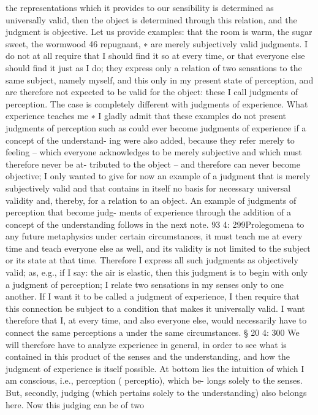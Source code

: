 the representations which it provides to our sensibility is determined as
universally valid, then the object is determined through this relation, and
the judgment is objective.
Let us provide examples: that the room is warm, the sugar sweet,
the wormwood 46 repugnant, ∗ are merely subjectively valid judgments.
I do not at all require that I should ﬁnd it so at every time, or that
everyone else should ﬁnd it just as I do; they express only a relation of
two sensations to the same subject, namely myself, and this only in my
present state of perception, and are therefore not expected to be valid for
the object: these I call judgments of perception. The case is completely
different with judgments of experience. What experience teaches me
∗
I gladly admit that these examples do not present judgments of perception such
as could ever become judgments of experience if a concept of the understand-
ing were also added, because they refer merely to feeling – which everyone
acknowledges to be merely subjective and which must therefore never be at-
tributed to the object – and therefore can never become objective; I only wanted
to give for now an example of a judgment that is merely subjectively valid and
that contains in itself no basis for necessary universal validity and, thereby, for a
relation to an object. An example of judgments of perception that become judg-
ments of experience through the addition of a concept of the understanding
follows in the next note.
93
4: 299Prolegomena to any future metaphysics
under certain circumstances, it must teach me at every time and teach
everyone else as well, and its validity is not limited to the subject or its
state at that time. Therefore I express all such judgments as objectively
valid; as, e.g., if I say: the air is elastic, then this judgment is to begin
with only a judgment of perception; I relate two sensations in my senses
only to one another. If I want it to be called a judgment of experience, I
then require that this connection be subject to a condition that makes it
universally valid. I want therefore that I, at every time, and also everyone
else, would necessarily have to connect the same perceptions a under the
same circumstances.
§ 20
4: 300
We will therefore have to analyze experience in general, in order to see
what is contained in this product of the senses and the understanding,
and how the judgment of experience is itself possible. At bottom lies the
intuition of which I am conscious, i.e., perception ( perceptio), which be-
longs solely to the senses. But, secondly, judging (which pertains solely
to the understanding) also belongs here. Now this judging can be of two
